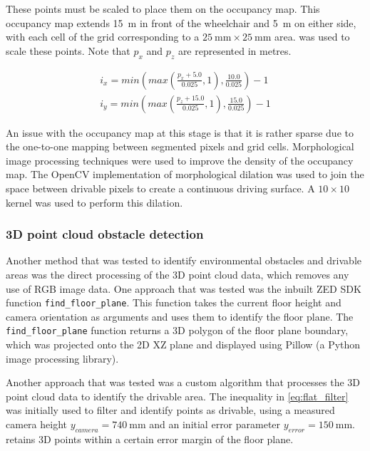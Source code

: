 These points must be scaled to place them on the occupancy map. This occupancy map
extends \SI{15}{\metre} in front of the wheelchair and \SI{5}{\metre} on either side,
with each cell of the grid corresponding to a $\SI{25}{\milli\metre}\times \SI{25}{\milli\metre}$ area.
 was used to scale these points. Note that $p_x$ and $p_z$ are
represented in metres.

\begin{equation}
\begin{split}
i_x = min\left(max\left(\frac{p_x + 5.0}{0.025}, 1\right), \frac{10.0}{0.025}\right) - 1\\
i_y = min\left(max\left(\frac{p_z + 15.0}{0.025}, 1\right), \frac{15.0}{0.025}\right) - 1
\end{split}
\label{eq:occupancy_scaling}
\end{equation}

An issue with the occupancy map at this stage is that it is rather sparse
due to the one-to-one mapping between segmented pixels and grid cells.
Morphological image processing techniques were used to improve the density of the occupancy map.
The OpenCV \cite{bradskiOpenCVLibrary2000} implementation of morphological dilation was used to
join the space between drivable pixels to create a continuous driving surface.
A $10\times 10$ kernel was used to perform this dilation.

\pagebreak
\subsubsection{3D point cloud obstacle detection}
\label{sec:point_cloud_obstacle_detection}

Another method that was tested to identify environmental obstacles and drivable areas
was the direct processing of the 3D point cloud data, which removes any use of RGB image data.
One approach that was tested was the inbuilt ZED SDK function \texttt{find\_floor\_plane}.
This function takes the current floor height and camera orientation as arguments
and uses them to identify the floor plane. The \texttt{find\_floor\_plane} function
returns a 3D polygon of the floor plane boundary, which was projected onto the 2D XZ plane
and displayed using Pillow (a Python image processing library).

Another approach that was tested was a custom algorithm that processes the 3D point cloud data
to identify the drivable area.
The inequality in \cref{eq:flat_filter} was initially used to filter and identify points as drivable,
using a measured camera height $y_{camera} = \SI{740}{\milli\metre}$
and an initial error parameter $y_{error} = \SI{150}{\milli\metre}$.
 retains 3D points within a certain error margin of the floor plane.

